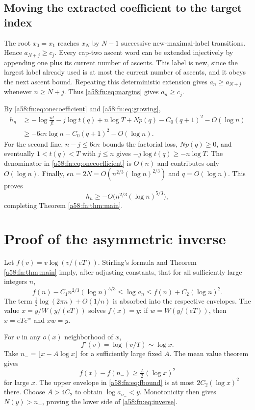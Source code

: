 \documentclass[11pt,letterpaper]{article}
\theoremstyle{remark}
\begin{document}
\subsection{Moving the extracted coefficient to the target index}
The root $x_0=x_1$ reaches $x_N$ by $N-1$ successive new-maximal-label transitions. Hence $a_{N+j}\ge c_j$. Every cap-two ascent word can be extended injectively by appending one plus its current number of ascents. This label is new, since the largest label already used is at most the current number of ascents, and it obeys the next ascent bound. Repeating this deterministic extension gives $a_n\ge a_{N+j}$ whenever $n\ge N+j$. Thus \eqref{a58:fn:eq:margins} gives $a_n\ge c_j$.

By \eqref{a58:fn:eq:onecoefficient} and \eqref{a58:fn:eq:growing},
\begin{align*}
 h_n&\ge-\log\frac{n!}{j!}-j\log t(q)+n\log T
           +Np(q)-C_0(q+1)^2-O(\log n)\\
 &\ge-6\epsilon n\log n-C_0(q+1)^2-O(\log n).
\end{align*}
For the second line, $n-j\le6\epsilon n$ bounds the factorial loss, $Np(q)\ge0$, and eventually $1<t(q)<T$ with $j\le n$ gives $-j\log t(q)\ge-n\log T$. The denominator in \eqref{a58:fn:eq:onecoefficient} is $O(n)$ and contributes only $O(\log n)$. Finally, $\epsilon n=2N=O(n^{2/3}(\log n)^{2/3})$ and $q=O(\log n)$. This proves
\[
 h_n\ge-O\bigl(n^{2/3}(\log n)^{5/3}\bigr),
\]
completing Theorem \ref{a58:fn:thm:main}.

\section{Proof of the asymmetric inverse}\label{a58:fn:sec:inverse}
Let $f(v)=v\log(v/(eT))$. Stirling's formula and Theorem \ref{a58:fn:thm:main} imply, after adjusting constants, that for all sufficiently large integers $n$,
\begin{equation}\label{a58:fn:eq:fbound}
 f(n)-C_1n^{2/3}(\log n)^{5/3}
 \le\log a_n\le f(n)+C_2(\log n)^2.
\end{equation}
The term $\tfrac12\log(2\pi n)+O(1/n)$ is absorbed into the respective envelopes. The value
$x=y/W(y/(eT))$ solves $f(x)=y$: if $w=W(y/(eT))$, then $x=eT e^w$ and $xw=y$.

For $v$ in any $o(x)$ neighborhood of $x$,
\[
 f'(v)=\log(v/T)\sim\log x.
\]
Take $n_- =\lfloor x-A\log x\rfloor$ for a sufficiently large fixed $A$. The mean value theorem gives
\[
 f(x)-f(n_-)\ge\tfrac A2(\log x)^2
\]
for large $x$. The upper envelope in \eqref{a58:fn:eq:fbound} is at most $2C_2(\log x)^2$ there. Choose $A>4C_2$ to obtain $\log a_{n_-}<y$. Monotonicity then gives $N(y)>n_-$, proving the lower side of \eqref{a58:fn:eq:inverse}.
\end{document}
